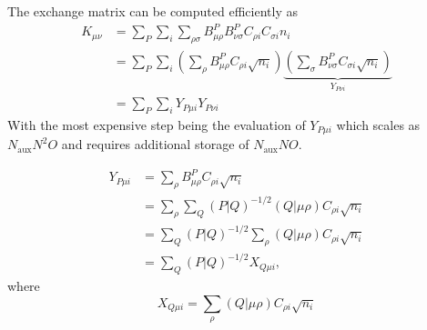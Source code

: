 \documentclass[aip,preprint]{revtex4-1}
\begin{document}
The exchange matrix can be computed efficiently as
\begin{equation}
\begin{split}
K_{\mu \nu} &= \sum_{P} \sum_{i}
\sum_{\rho \sigma} B^{P}_{\mu \rho} B^{P}_{\nu \sigma} C_{\rho i} C_{\sigma i} n_i \\
&= \sum_{P} \sum_{i}
\left(\sum_{\rho} B^{P}_{\mu \rho}  C_{\rho i}\sqrt{n_i} \right)
\underbrace{\left(\sum_{\sigma} B^{P}_{\nu \sigma} C_{\sigma i} \sqrt{n_i}\right)}_{Y_{P \nu i}} \\
&= \sum_{P} \sum_{i}
Y_{P \mu i} Y_{P \nu i}
\end{split}
\end{equation}
With the most expensive step being the evaluation of $Y_{P \mu i}$ which scales as $N_\mathrm{aux} N^2 O$ and requires additional storage of $N_\mathrm{aux} N O$.

\begin{equation}
\begin{split}
Y_{P \mu i} & = \sum_{\rho} B^{P}_{\mu \rho} C_{\rho i}\sqrt{n_i} \\
& = \sum_{\rho} \sum_{Q} (P|Q)^{-1/2} (Q | \mu \rho) C_{\rho i}\sqrt{n_i} \\
& = \sum_{Q} (P|Q)^{-1/2} \sum_{\rho} (Q | \mu \rho) C_{\rho i}\sqrt{n_i} \\
& = \sum_{Q} (P|Q)^{-1/2} X_{Q \mu i},
\end{split}
\end{equation}
where
\begin{equation}
X_{Q \mu i} = \sum_{\rho} (Q | \mu \rho) C_{\rho i}\sqrt{n_i}
\end{equation}
\end{document}
